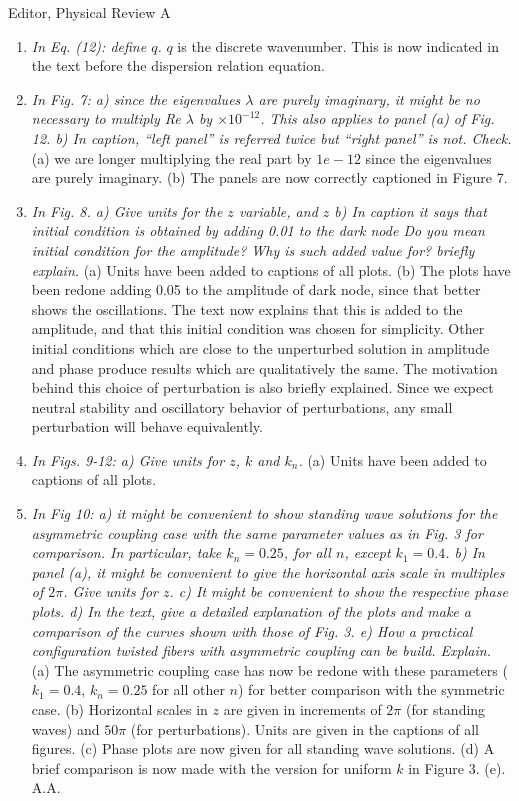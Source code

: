 \documentclass[11pt]{letter}
\begin{document}
\begin{letter}{Editor, Physical Review A}
\begin{enumerate}
\item \emph{In Eq. (12): define $q$.} $q$ is the discrete wavenumber. This is now indicated in the text before the dispersion relation equation.

\item \emph{In Fig. 7: a) since the eigenvalues $\lambda$ are purely imaginary, it might be no necessary to multiply Re $\lambda$ by $\times10^{-12}$. This also applies to panel (a) of Fig. 12. b) In caption, ``left panel'' is referred twice but ``right panel'' is not. Check.} (a) we are longer multiplying the real part by $1e-12$ since the eigenvalues are purely imaginary. (b) The panels are now correctly captioned in Figure 7.

\item \emph{In Fig. 8. a) Give units for the $z$ variable, and $z$ b) In caption it says that initial condition is obtained by adding 0.01 to the dark node Do you mean initial condition for the amplitude? Why is such added value for? briefly explain.} (a) Units have been added to captions of all plots. (b) The plots have been redone adding 0.05 to the amplitude of dark node, since that better shows the oscillations. The text now explains that this is added to the amplitude, and that this initial condition was chosen for simplicity. Other initial conditions which are close to the unperturbed solution in amplitude and phase produce results which are qualitatively the same. The motivation behind this choice of perturbation is also briefly explained. Since we expect neutral stability and oscillatory behavior of perturbations, any small perturbation will behave equivalently.

\item \emph{In Figs. 9-12: a) Give units for $z$, $k$ and $k_n$.} (a) Units have been added to captions of all plots.

\item \emph{In Fig 10: a) it might be convenient to show standing wave solutions for the asymmetric coupling case with the same parameter values as in Fig. 3 for comparison. In particular, take $k_n=0.25$, for all $n$, except $k_1=0.4$. b) In panel (a), it might be convenient to give the horizontal axis scale in multiples of $2\pi$. Give units for $z$. c) It might be convenient to show the respective phase plots. d) In the text, give a detailed explanation of the plots and make a comparison of the curves shown with those of Fig. 3. e) How a practical configuration twisted fibers with asymmetric coupling can be build. Explain.} (a) The asymmetric coupling case has now be redone with these parameters ($k_1 = 0.4$, $k_n=0.25$ for all other $n$) for better comparison with the symmetric case. (b) Horizontal scales in $z$ are given in increments of $2 \pi$ (for standing waves) and $50 \pi$ (for perturbations). Units are given in the captions of all figures. (c) Phase plots are now given for all standing wave solutions. (d) A brief comparison is now made with the version for uniform $k$ in Figure 3. (e). A.A.


\end{enumerate}
\end{letter}
\end{document}
